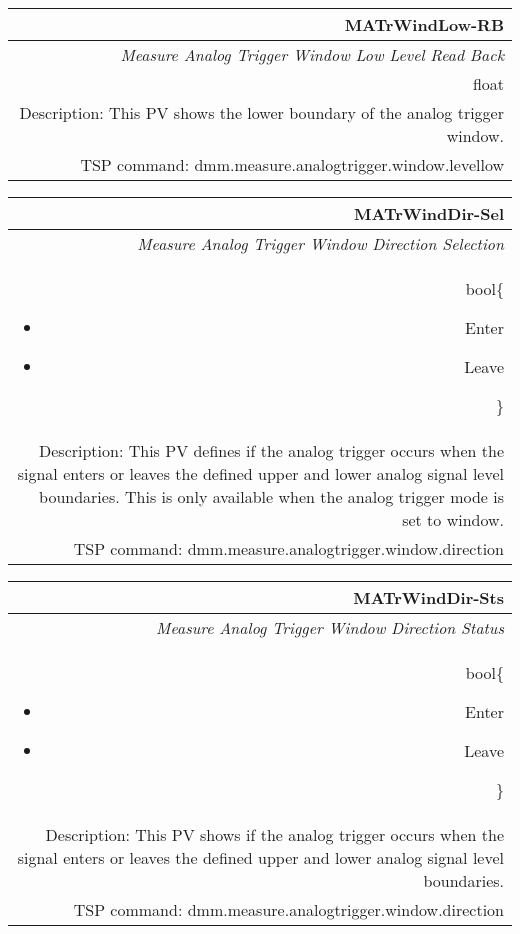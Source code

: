 \documentclass[openany]{article}
\begin{document}
		\begin{tabular}{N}
			\hline
			\bfseries MATrWindLow-RB\label{pv:matrwindlow-rb} \\ \hline
			\emph{Measure Analog Trigger Window Low Level Read Back} \\
			float \\
			Description: This PV shows the lower boundary of the analog trigger window. \\
			TSP command: dmm.measure.analogtrigger.window.levellow
		\end{tabular}

		\begin{tabular}{N}
			\hline
			\bfseries MATrWindDir-Sel\label{pv:matrwinddir-sel} \\ \hline
			\emph{Measure Analog Trigger Window Direction Selection} \\
			bool\{\begin{itemize}[noitemsep]
				\small
				\item[] Enter
				\item[] Leave
			\end{itemize}\} \\
			Description: This PV defines if the analog trigger occurs when the signal enters or leaves the defined upper and lower analog signal level boundaries. This is only available when the analog trigger mode is set to window. \\
			TSP command: dmm.measure.analogtrigger.window.direction
		\end{tabular}

		\begin{tabular}{N}
			\hline
			\bfseries MATrWindDir-Sts\label{pv:matrwinddir-sts} \\ \hline
			\emph{Measure Analog Trigger Window Direction Status} \\
			bool\{\begin{itemize}[noitemsep]
				\small
				\item[] Enter
				\item[] Leave
			\end{itemize}\} \\
			Description: This PV shows if the analog trigger occurs when the signal enters or leaves the defined upper and lower analog signal level boundaries. \\
			TSP command: dmm.measure.analogtrigger.window.direction
		\end{tabular}
\end{document}

